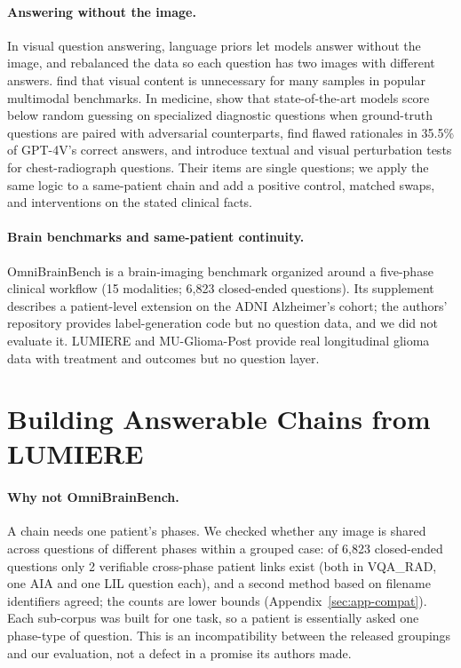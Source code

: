 \paragraph{Answering without the image.} In visual question answering, language priors let models answer without the image, and \citet{goyal2017making} rebalanced the data so each question has two images with different answers. \citet{chen2024right} find that visual content is unnecessary for many samples in popular multimodal benchmarks. In medicine, \citet{yan2025worse} show that state-of-the-art models score below random guessing on specialized diagnostic questions when ground-truth questions are paired with adversarial counterparts, \citet{jin2024hidden} find flawed rationales in 35.5\% of GPT-4V's correct answers, and \citet{nguyen2025localizing} introduce textual and visual perturbation tests for chest-radiograph questions. Their items are single questions; we apply the same logic to a same-patient chain and add a positive control, matched swaps, and interventions on the stated clinical facts.

\paragraph{Brain benchmarks and same-patient continuity.} OmniBrainBench \citep{peng2026omnibrainbench} is a brain-imaging benchmark organized around a five-phase clinical workflow (15 modalities; 6,823 closed-ended questions). Its supplement describes a patient-level extension on the ADNI Alzheimer's cohort; the authors' repository provides label-generation code but no question data, and we did not evaluate it. LUMIERE \citep{suter2022lumiere} and MU-Glioma-Post \citep{muglioma2025post} provide real longitudinal glioma data with treatment and outcomes but no question layer.

\section{Building Answerable Chains from LUMIERE}
\label{sec:lumiere}

\paragraph{Why not OmniBrainBench.} A chain needs one patient's phases. We checked whether any image is shared across questions of different phases within a grouped case: of 6,823 closed-ended questions only 2 verifiable cross-phase patient links exist (both in VQA\_RAD, one AIA and one LIL question each), and a second method based on filename identifiers agreed; the counts are lower bounds (Appendix~\ref{sec:app-compat}). Each sub-corpus was built for one task, so a patient is essentially asked one phase-type of question. This is an incompatibility between the released groupings and our evaluation, not a defect in a promise its authors made.

